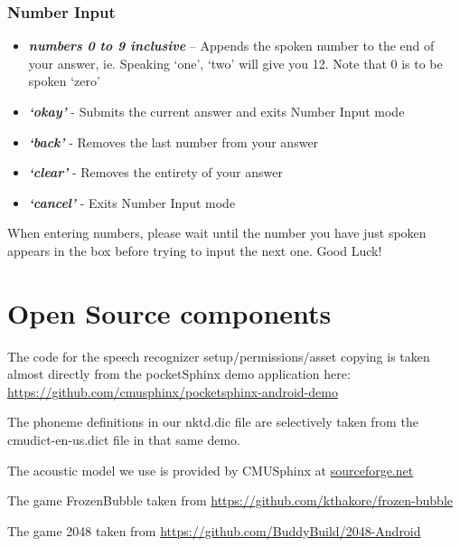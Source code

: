 \documentclass[11pt, oneside]{article}
\begin{document}
\pagebreak

\subsubsection{Number Input}
\begin{itemize}
  \item {\em\bf numbers 0 to 9 inclusive} – Appends the spoken number
    to the end of your answer, ie. Speaking `one', `two' will give you
    12. Note that 0 is to be spoken `zero'
  \item {\em\bf `okay'} - Submits the current answer and exits Number
    Input mode
  \item {\em\bf `back'} - Removes the last number from your answer
  \item {\em\bf `clear'} - Removes the entirety of your answer
  \item {\em\bf `cancel'} - Exits Number Input mode
\end{itemize}

When entering numbers, please wait until the number you have just spoken appears
in the box before trying to input the next one.
Good Luck!

\section{Open Source components}

The code for the speech recognizer setup/permissions/asset copying is
taken almost directly from the pocketSphinx demo application here:
\url{https://github.com/cmusphinx/pocketsphinx-android-demo}

The phoneme definitions in our nktd.dic file are selectively taken
from the cmudict-en-us.dict file in that same demo.

The acoustic model we use is provided by CMUSphinx at
\href{https://sourceforge.net/projects/cmusphinx/files/Acoustic\%20and\%20Language\%20Models/US\%20English/}{sourceforge.net}

The game FrozenBubble taken from
\url{https://github.com/kthakore/frozen-bubble}

The game 2048 taken from
\url{https://github.com/BuddyBuild/2048-Android}
    
\end{document}
